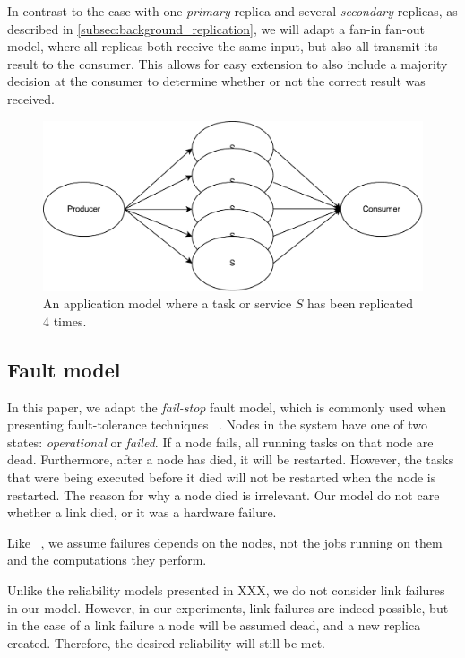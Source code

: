 \documentclass{cslthse-msc}
\begin{document}
In contrast to the case with one \emph{primary} replica and several \emph{secondary} replicas, as described in \cref{subsec:background_replication}, we will adapt a fan-in fan-out model, where all replicas both receive the same input, but also all transmit its result to the consumer. This allows for easy extension to also include a majority decision at the consumer to determine whether or not the correct result was received. %

\begin{figure}[!hbt]
\centering
\includegraphics[scale=0.5]{images/app_model_replication.pdf} 
\caption{An application model where a task or service $S$ has been replicated 4 times.}\label{fig:app_model_replication}
\end{figure}

\subsection{Fault model} \label{subsec:design_fault_model}
In this paper, we adapt the \emph{fail-stop} fault model, which is commonly used when presenting fault-tolerance techniques ~\cite{surveyFaultParallel}. Nodes in the system have one of two states: \emph{operational} or \emph{failed}. If a node fails, all running tasks on that node are dead. Furthermore, after a node has died, it will be restarted. However, the tasks that were being executed before it died will not be restarted when the node is restarted. The reason for why a node died is irrelevant. Our model do not care whether a link died, or it was a hardware failure. 

Like ~\cite{selfAdaptRel}, we assume failures depends on the nodes, not the jobs running on them and the computations they perform.

Unlike the reliability models presented in XXX, we do not consider link failures in our model. However, in our experiments, link failures are indeed possible, but in the case of a link failure a node will be assumed dead, and a new replica created. Therefore, the desired reliability will still be met. %
\end{document}
